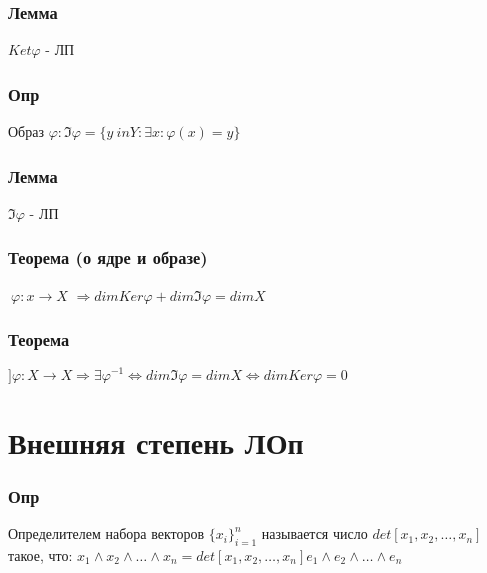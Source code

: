 \documentclass{article}
\begin{document}
\subsubsection{Лемма}
$Ket \varphi$ - ЛП

\subsubsection{Опр}
Образ $\varphi : \Im \varphi = \{y \ in Y : \exists x : \varphi(x) = y\}$

\subsubsection{Лемма}
$\Im \varphi$ - ЛП

\subsubsection{Теорема (о ядре и образе)}
$\ \varphi : x \rightarrow X$
$\Rightarrow dim Ker \varphi + dim \Im \varphi = dim X$


\subsubsection{Теорема}
$] \varphi : X \rightarrow X \Rightarrow \exists \varphi^{-1} \Leftrightarrow
dim \Im \varphi = dim X \Leftrightarrow dim Ker \varphi = 0$

\section{Внешняя степень ЛОп}

\subsubsection{Опр}
Определителем набора векторов $\{x_i\}_{i=1}^n$  называется число $det[x_1, x_2,
\dots, x_n]$ такое, что: $x_1 \wedge x_2 \wedge \dots \wedge x_n = det[x_1, x_2,
\dots, x_n]e_1 \wedge e_2 \wedge \dots \wedge e_n$
\end{document}
